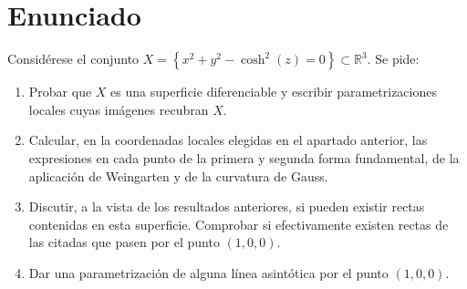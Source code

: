 \section{Enunciado}
Considérese el conjunto $X = \left\{ x^2 + y^2 - \cosh^2\left( z \right) = 0
\right\} \subset \mathbb{R}^3$. Se pide:
\begin{enumerate}
    \item Probar que $X$ es una superficie diferenciable y escribir
        parametrizaciones locales cuyas imágenes recubran $X$.
    \item Calcular, en la coordenadas locales elegidas en el apartado anterior,
        las expresiones en cada punto de la primera y segunda forma fundamental,
        de la aplicación de Weingarten y de la curvatura de Gauss.
    \item Discutir, a la vista de los resultados anteriores, si pueden existir
        rectas contenidas en esta superficie. Comprobar si efectivamente existen
        rectas de las citadas que pasen por el punto $\left( 1, 0, 0 \right)$.
    \item Dar una parametrización de alguna línea asintótica por el punto
        $\left( 1, 0, 0 \right)$.
\end{enumerate}
